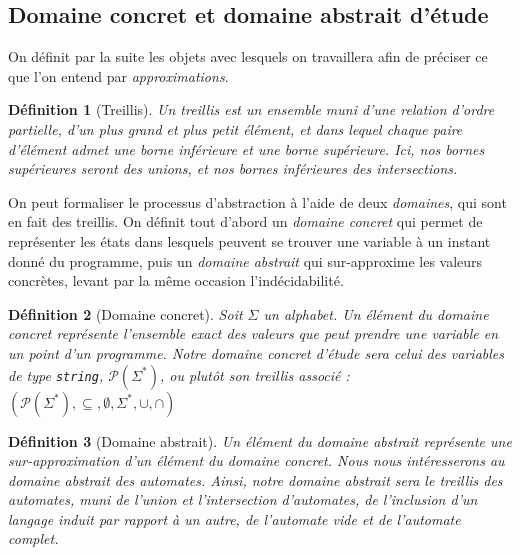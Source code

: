 \documentclass{article}
\newtheorem{definition}{Définition}
\begin{document}

\subsection{Domaine concret et domaine abstrait d'étude}

On définit par la suite les objets avec lesquels on travaillera afin de préciser ce que l'on entend par
\emph{approximations}. 

\begin{definition}[Treillis] %
    Un treillis est un ensemble muni d'une relation d'ordre partielle, d'un plus grand et plus petit élément,
    et dans lequel chaque paire d'élément admet une borne inférieure et une borne supérieure.
    Ici, nos bornes supérieures seront des unions, et nos bornes inférieures des intersections.
\end{definition}

On peut formaliser le processus d'abstraction à l'aide de deux \emph{domaines}, qui sont en fait des treillis.
On définit tout d'abord un \emph{domaine concret} qui permet de représenter les états dans lesquels peuvent
se trouver une variable à un instant donné du programme, puis un \emph{domaine abstrait}
qui sur-approxime les valeurs concrètes, levant par la même occasion l'indécidabilité.

\begin{definition}[Domaine concret]
    Soit $\Sigma$ un alphabet.
    Un élément du domaine concret représente l'ensemble exact des valeurs que peut prendre une variable
    en un point d'un programme. Notre domaine concret d'étude sera celui des variables de type
    \emph{\texttt{string}}, $\mathcal{P}(\Sigma^*)$, ou plutôt son treillis associé :
    $(\mathcal{P}(\Sigma^*), \subseteq, \emptyset, \Sigma^*, \cup, \cap)$
\end{definition}

\begin{definition}[Domaine abstrait]
    Un élément du domaine abstrait représente une sur-approximation d'un élément du domaine concret.
    Nous nous intéresserons au domaine abstrait des automates. Ainsi, notre domaine abstrait sera
    le treillis des automates, muni de l'union et l'intersection d'automates, de l'inclusion d'un
    langage induit par rapport à un autre, de l'automate vide et de l'automate complet.
\end{definition}
\end{document}
